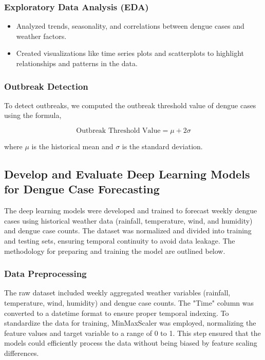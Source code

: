 \subsubsection{Exploratory Data Analysis (EDA)}
\begin{itemize}
	\item Analyzed trends, seasonality, and correlations between dengue cases and weather factors.
	\item Created visualizations like time series plots and scatterplots to highlight relationships and patterns in the data.
\end{itemize}

\subsubsection{Outbreak Detection}
To detect outbreaks, we computed the outbreak threshold value of dengue cases using the formula, 

\begin{equation}
	\text{Outbreak Threshold Value} = \mu + 2\sigma
\end{equation}

where \(\mu\) is the historical mean and \(\sigma \) is the standard deviation.

\subsection{Develop and Evaluate Deep Learning Models for Dengue Case Forecasting}
The deep learning models were developed and trained to forecast weekly dengue cases using historical weather data (rainfall, temperature, wind, and humidity) and dengue case counts. The dataset was normalized and divided into training and testing sets, ensuring temporal continuity to avoid data leakage. The methodology for preparing and training the model are outlined below.
\subsubsection{Data Preprocessing}
The raw dataset included weekly aggregated weather variables (rainfall, temperature, wind, humidity) and dengue case counts. The "Time" column was converted to a datetime format to ensure proper temporal indexing. To standardize the data for training, MinMaxScaler was employed, normalizing the feature values and target variable to a range of 0 to 1. This step ensured that the models could efficiently process the data without being biased by feature scaling differences.

